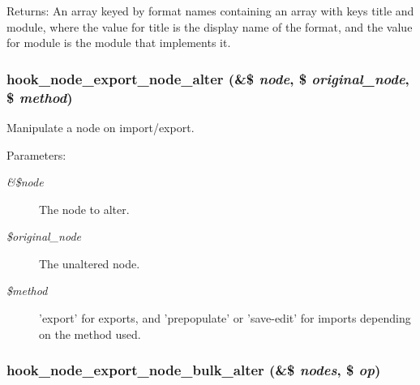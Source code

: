 \begin{Desc}
\item[Returns:]An array keyed by format names containing an array with keys title and module, where the value for title is the display name of the format, and the value for module is the module that implements it. \end{Desc}
\hypertarget{node__export_8api_8php_02844b873762538790439bc217d6e5de}{
\subsubsection[{hook\_\-node\_\-export\_\-node\_\-alter}]{\setlength{\rightskip}{0pt plus 5cm}hook\_\-node\_\-export\_\-node\_\-alter (\&\$ {\em node}, \/  \$ {\em original\_\-node}, \/  \$ {\em method})}}
\label{node__export_8api_8php_02844b873762538790439bc217d6e5de}


Manipulate a node on import/export.

\begin{Desc}
\item[Parameters:]
\begin{description}
\item[{\em \&\$node}]The node to alter. \item[{\em \$original\_\-node}]The unaltered node. \item[{\em \$method}]'export' for exports, and 'prepopulate' or 'save-edit' for imports depending on the method used. \end{description}
\end{Desc}
\hypertarget{node__export_8api_8php_231756420bcf1606865365dc50f65cbb}{
\subsubsection[{hook\_\-node\_\-export\_\-node\_\-bulk\_\-alter}]{\setlength{\rightskip}{0pt plus 5cm}hook\_\-node\_\-export\_\-node\_\-bulk\_\-alter (\&\$ {\em nodes}, \/  \$ {\em op})}}
\label{node__export_8api_8php_231756420bcf1606865365dc50f65cbb}


